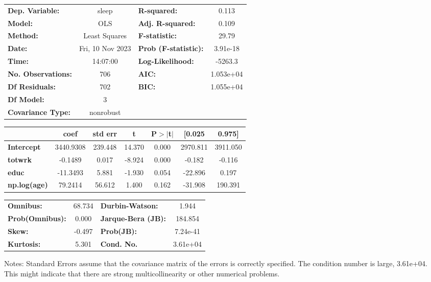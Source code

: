 \documentclass{report}
\begin{document}
\begin{center}
\begin{tabular}{lclc}
\toprule
\textbf{Dep. Variable:}    &      sleep       & \textbf{  R-squared:         } &     0.113   \\
\textbf{Model:}            &       OLS        & \textbf{  Adj. R-squared:    } &     0.109   \\
\textbf{Method:}           &  Least Squares   & \textbf{  F-statistic:       } &     29.79   \\
\textbf{Date:}             & Fri, 10 Nov 2023 & \textbf{  Prob (F-statistic):} &  3.91e-18   \\
\textbf{Time:}             &     14:07:00     & \textbf{  Log-Likelihood:    } &   -5263.3   \\
\textbf{No. Observations:} &         706      & \textbf{  AIC:               } & 1.053e+04   \\
\textbf{Df Residuals:}     &         702      & \textbf{  BIC:               } & 1.055e+04   \\
\textbf{Df Model:}         &           3      & \textbf{                     } &             \\
\textbf{Covariance Type:}  &    nonrobust     & \textbf{                     } &             \\
\bottomrule
\end{tabular}
\begin{tabular}{lcccccc}
                     & \textbf{coef} & \textbf{std err} & \textbf{t} & \textbf{P$> |$t$|$} & \textbf{[0.025} & \textbf{0.975]}  \\
\midrule
\textbf{Intercept}   &    3440.9308  &      239.448     &    14.370  &         0.000        &     2970.811    &     3911.050     \\
\textbf{totwrk}      &      -0.1489  &        0.017     &    -8.924  &         0.000        &       -0.182    &       -0.116     \\
\textbf{educ}        &     -11.3493  &        5.881     &    -1.930  &         0.054        &      -22.896    &        0.197     \\
\textbf{np.log(age)} &      79.2414  &       56.612     &     1.400  &         0.162        &      -31.908    &      190.391     \\
\bottomrule
\end{tabular}
\begin{tabular}{lclc}
\textbf{Omnibus:}       & 68.734 & \textbf{  Durbin-Watson:     } &    1.944  \\
\textbf{Prob(Omnibus):} &  0.000 & \textbf{  Jarque-Bera (JB):  } &  184.854  \\
\textbf{Skew:}          & -0.497 & \textbf{  Prob(JB):          } & 7.24e-41  \\
\textbf{Kurtosis:}      &  5.301 & \textbf{  Cond. No.          } & 3.61e+04  \\
\bottomrule
\end{tabular}
\end{center}

Notes: \newline
 [1] Standard Errors assume that the covariance matrix of the errors is correctly specified. \newline
 [2] The condition number is large, 3.61e+04. This might indicate that there are \newline
 strong multicollinearity or other numerical problems.
\end{document}
